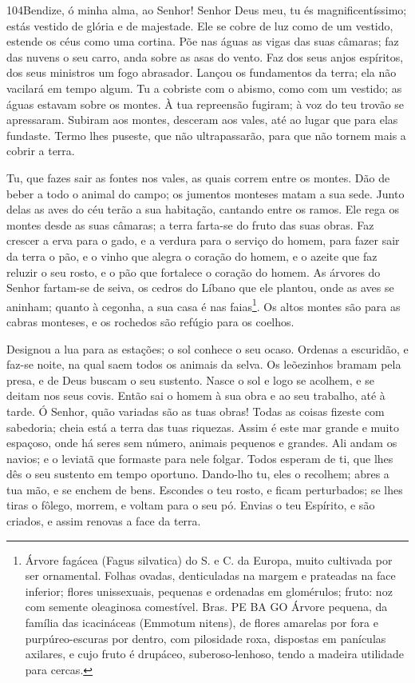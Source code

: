 \bigskip

\lettrine{104}{}Bendize, ó minha alma, ao Senhor! Senhor Deus
meu, tu és magnificentíssimo; estás vestido de glória e de
majestade. Ele se cobre de luz como de um vestido, estende os
céus como uma cortina. Põe nas águas as vigas das suas câmaras;
faz das nuvens o seu carro, anda sobre as asas do vento. Faz dos
seus anjos espíritos, dos seus ministros um fogo abrasador.
Lançou os fundamentos da terra; ela não vacilará em tempo algum.
Tu a cobriste com o abismo, como com um vestido; as águas
estavam sobre os montes. À tua repreensão fugiram; à voz do teu
trovão se apressaram. Subiram aos montes, desceram aos vales,
até ao lugar que para elas fundaste. Termo lhes puseste, que não
ultrapassarão, para que não tornem mais a cobrir a terra.

Tu, que fazes sair as fontes nos vales, as quais correm entre os
montes. Dão de beber a todo o animal do campo; os jumentos
monteses matam a sua sede. Junto delas as aves do céu terão a
sua habitação, cantando entre os ramos. Ele rega os montes
desde as suas câmaras; a terra farta-se do fruto das suas obras.
Faz crescer a erva para o gado, e a verdura para o serviço do
homem, para fazer sair da terra o pão, e o vinho que alegra o
coração do homem, e o azeite que faz reluzir o seu rosto, e o pão
que fortalece o coração do homem. As árvores do Senhor
fartam-se de seiva, os cedros do Líbano que ele plantou, onde
as aves se aninham; quanto à cegonha, a sua casa é nas
faias\footnote{Árvore fagácea (Fagus silvatica) do S. e C. da
Europa, muito cultivada por ser ornamental. Folhas ovadas,
denticuladas na margem e prateadas na face inferior; flores
unissexuais, pequenas e ordenadas em glomérulos; fruto: noz com
semente oleaginosa comestível. Bras. PE BA GO Árvore pequena, da
família das icacináceas (Emmotum nitens), de flores amarelas por
fora e purpúreo-escuras por dentro, com pilosidade roxa, dispostas
em panículas axilares, e cujo fruto é drupáceo, suberoso-lenhoso,
tendo a madeira utilidade para cercas.}. Os altos montes são
para as cabras monteses, e os rochedos são refúgio para os coelhos.

Designou a lua para as estações; o sol conhece o seu ocaso.
Ordenas a escuridão, e faz-se noite, na qual saem todos os
animais da selva. Os leõezinhos bramam pela presa, e de Deus
buscam o seu sustento. Nasce o sol e logo se acolhem, e se
deitam nos seus covis. Então sai o homem à sua obra e ao seu
trabalho, até à tarde. Ó Senhor, quão variadas são as tuas
obras! Todas as coisas fizeste com sabedoria; cheia está a terra das
tuas riquezas. Assim é este mar grande e muito espaçoso, onde
há seres sem número, animais pequenos e grandes. Ali andam os
navios; e o leviatã que formaste para nele folgar. Todos
esperam de ti, que lhes dês o seu sustento em tempo oportuno.
Dando-lho tu, eles o recolhem; abres a tua mão, e se enchem
de bens. Escondes o teu rosto, e ficam perturbados; se lhes
tiras o fôlego, morrem, e voltam para o seu pó. Envias o teu
Espírito, e são criados, e assim renovas a face da terra.

